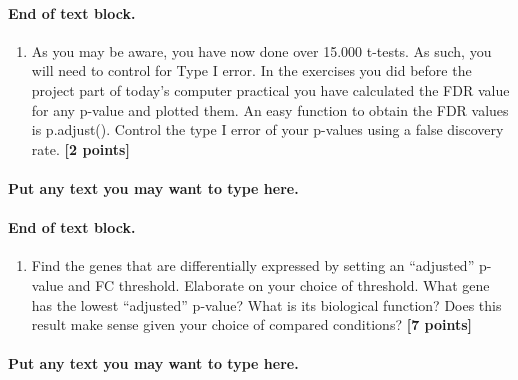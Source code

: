 \documentclass[
]{article}
\providecommand{\tightlist}{%
  \setlength{\itemsep}{0pt}\setlength{\parskip}{0pt}}
\begin{document}
\hypertarget{end-of-text-block.-12}{%
\paragraph{End of text block.}\label{end-of-text-block.-12}}

\begin{enumerate}
\def\labelenumi{\Alph{enumi})}
\setcounter{enumi}{6}
\tightlist
\item
  As you may be aware, you have now done over 15.000 t-tests. As such,
  you will need to control for Type I error. In the exercises you did
  before the project part of today's computer practical you have
  calculated the FDR value for any p-value and plotted them. An easy
  function to obtain the FDR values is p.adjust(). Control the type I
  error of your p-values using a false discovery rate. \textbf{{[}2
  points{]}}
\end{enumerate}

\hypertarget{put-any-text-you-may-want-to-type-here.-11}{%
\paragraph{Put any text you may want to type
here.}\label{put-any-text-you-may-want-to-type-here.-11}}

\hypertarget{end-of-text-block.-13}{%
\paragraph{End of text block.}\label{end-of-text-block.-13}}

\begin{enumerate}
\def\labelenumi{\Alph{enumi})}
\setcounter{enumi}{7}
\tightlist
\item
  Find the genes that are differentially expressed by setting an
  ``adjusted'' p-value and FC threshold. Elaborate on your choice of
  threshold. What gene has the lowest ``adjusted'' p-value? What is its
  biological function? Does this result make sense given your choice of
  compared conditions? \textbf{{[}7 points{]}}
\end{enumerate}

\hypertarget{put-any-text-you-may-want-to-type-here.-12}{%
\paragraph{Put any text you may want to type
here.}\label{put-any-text-you-may-want-to-type-here.-12}}
\end{document}
